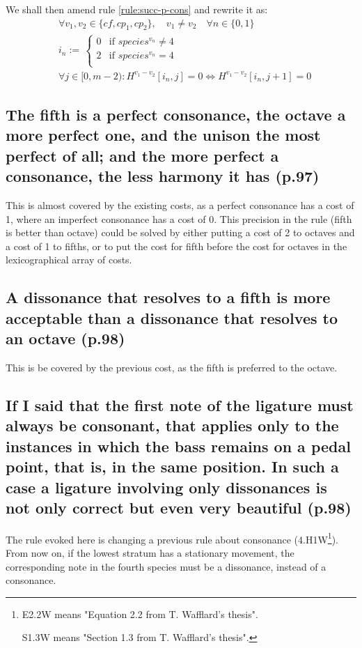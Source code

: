 We shall then amend rule \ref{rule:succ-p-cons} and rewrite it as:
\begin{equation} \begin{aligned}
    &\forall v_1, v_2 \in \{cf, cp_1, cp_2\}, \quad v_1 \neq v_2 \quad \forall n \in \{0, 1\} \\
    &i_n := \,  
    \begin{cases}
        0 & \text{if } species^{v_n} \neq 4\\
        2 & \text{if } species^{v_n} = 4\\
    \end{cases}\\
    &\forall j \in [0, m-2) \colon H^{v_1-v_2}[i_n, j] = 0 \iff H^{v_1-v_2}[i_n, j+1] = 0
\end{aligned} \end{equation}

\subsection{The fifth is a perfect consonance, the octave a more perfect one, and the unison the most perfect of all; and the more perfect a consonance, the less harmony it has (p.97)}
This is almost covered by the existing costs, as a perfect consonance has a cost of 1, where an imperfect consonance has a cost of 0. This precision in the rule (fifth is better than octave) could be solved by either putting a cost of 2 to octaves and a cost of 1 to fifths, or to put the cost for fifth before the cost for octaves in the lexicographical array of costs.
\subsection{A dissonance that resolves to a fifth is more acceptable than a dissonance that resolves to an octave (p.98)}
This is be covered by the previous cost, as the fifth is preferred to the octave.

\subsection{If I said that the first note of the ligature must always be consonant, that applies only to the instances in which the bass remains on a pedal point, that is, in the same position. In such a case a ligature involving only dissonances is not only correct but even very beautiful (p.98)}
The rule evoked here is changing a previous rule about consonance (4.H1W\footnote{E2.2W means "Equation 2.2 from T. Wafflard's thesis".

S1.3W means "Section 1.3 from T. Wafflard's thesis".}). From now on, if the lowest stratum has a stationary movement, the corresponding note in the fourth species must be a dissonance, instead of a consonance.

